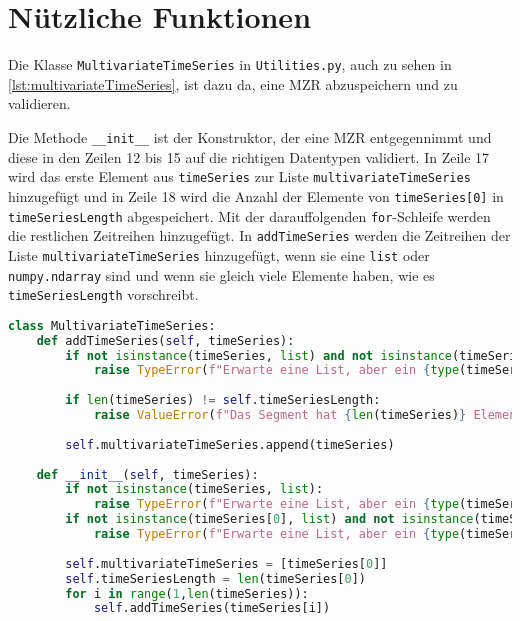 \section{Nützliche Funktionen}
Die Klasse \lstinline|MultivariateTimeSeries| in \texttt{Utilities.py}, auch zu sehen in \autoref{lst:multivariateTimeSeries}, ist dazu da, eine \ac{MZR} abzuspeichern und zu validieren.

Die Methode \lstinline{__init__} ist der Konstruktor, der eine \ac{MZR} entgegennimmt und diese in den Zeilen 12 bis 15 auf die richtigen Datentypen validiert. In Zeile 17 wird das erste Element aus \lstinline|timeSeries| zur Liste \lstinline|multivariateTimeSeries| hinzugefügt und in Zeile 18 wird die Anzahl der Elemente von \lstinline|timeSeries[0]| in \lstinline|timeSeriesLength| abgespeichert. Mit der darauffolgenden \lstinline|for|-Schleife werden die restlichen Zeitreihen hinzugefügt. In \lstinline|addTimeSeries| werden die Zeitreihen der Liste \lstinline|multivariateTimeSeries| hinzugefügt, wenn sie eine \lstinline|list| oder \lstinline|numpy.ndarray| sind und wenn sie gleich viele Elemente haben, wie es \lstinline|timeSeriesLength| vorschreibt. 
\begin{lstlisting}[caption=Klasse für \ac{MZR}, language=Python, label=lst:multivariateTimeSeries, style=Python]
class MultivariateTimeSeries:
    def addTimeSeries(self, timeSeries):
        if not isinstance(timeSeries, list) and not isinstance(timeSeries, np.ndarray):
            raise TypeError(f"Erwarte eine List, aber ein {type(timeSeries)} erhalten.")
        
        if len(timeSeries) != self.timeSeriesLength:
            raise ValueError(f"Das Segment hat {len(timeSeries)} Element(e), muss aber {self.timeSeriesLength} haben.")
        
        self.multivariateTimeSeries.append(timeSeries)
    
    def __init__(self, timeSeries):
        if not isinstance(timeSeries, list):
            raise TypeError(f"Erwarte eine List, aber ein {type(timeSeries)} erhalten.")
        if not isinstance(timeSeries[0], list) and not isinstance(timeSeries[0], np.ndarray):
            raise TypeError(f"Erwarte eine List, aber ein {type(timeSeries[0])} erhalten.")
        
        self.multivariateTimeSeries = [timeSeries[0]]
        self.timeSeriesLength = len(timeSeries[0])
        for i in range(1,len(timeSeries)):
            self.addTimeSeries(timeSeries[i])
\end{lstlisting}

